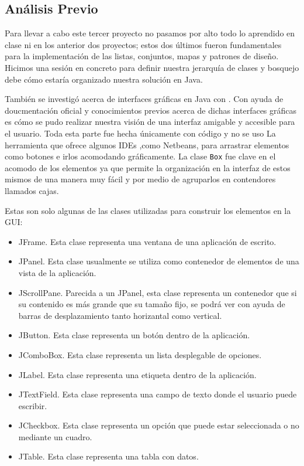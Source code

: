 \subsection*{Análisis Previo}

Para llevar a cabo este tercer proyecto no pasamos por alto todo lo aprendido en clase ni en los anterior
dos proyectos; estos dos últimos fueron fundamentales para la implementación de las listas, conjuntos, mapas
y patrones de diseño. Hicimos una sesión en concreto para definir nuestra jerarquía de clases y bosquejo debe
cómo estaría organizado nuestra solución en Java.

También se investigó acerca de interfaces gráficas en Java con . Con ayuda de doucmentación
oficial y conocimientos previos acerca de dichas interfaces gráficas es cómo se pudo realizar nuestra visión de
una interfaz amigable y accesible para el usuario. Toda esta parte fue hecha únicamente con código y no se uso La
herramienta que ofrece algunos IDEs ,como Netbeans, para arrastrar elementos como botones e irlos acomodando gráficamente.
La clase \texttt{Box} fue clave en el acomodo de los elementos ya que permite la organización en la interfaz de estos mismos
de una manera muy fácil y por medio de agruparlos en contendores llamados cajas.

Estas son solo algunas de las clases utilizadas para construir los elementos en la GUI:

\begin{itemize}
    \item JFrame. Esta clase representa una ventana de una aplicación de escrito.
    \item JPanel. Esta clase usualmente se utiliza como contenedor de elementos de una vista de la aplicación.
    \item JScrollPane. Parecida a un JPanel, esta clase representa un contenedor que si su contenido es más grande que su tamaño
    fijo, se podrá ver con ayuda de barras de desplazamiento tanto horizantal como vertical.
    \item JButton. Esta clase representa un botón dentro de la aplicación. 
    \item JComboBox. Esta clase representa un lista desplegable de opciones.
    \item JLabel. Esta clase representa una etiqueta dentro de la aplicación.
    \item JTextField. Esta clase representa una campo de texto donde el usuario puede escribir.
    \item JCheckbox. Esta clase representa un opción que puede estar seleccionada o no mediante un cuadro.
    \item JTable. Esta clase representa una tabla con datos.
  \end{itemize}

